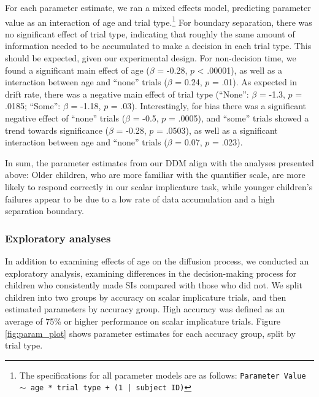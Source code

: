 \documentclass[10pt, letterpaper]{article}
\begin{document}
For each parameter estimate, we ran a mixed effects model, predicting
parameter value as an interaction of age and trial
type.\footnote{The specifications for all parameter models are as follows: \texttt{Parameter Value $\sim$ age * trial type + (1 | subject ID)}}
For boundary separation, there was no significant effect of trial type,
indicating that roughly the same amount of information needed to be
accumulated to make a decision in each trial type. This should be
expected, given our experimental design. For non-decision time, we found
a significant main effect of age (\(\beta\) = -0.28, \(p\) \textless{}
.00001), as well as a interaction between age and ``none'' trials
(\(\beta\) = 0.24, \(p\) = .01). As expected in drift rate, there was a
negative main effect of trial type (``None'': \(\beta\) = -1.3, \(p\) =
.0185; ``Some'': \(\beta\) = -1.18, \(p\) = .03). Interestingly, for
bias there was a significant negative effect of ``none'' trials
(\(\beta\) = -0.5, \(p\) = .0005), and ``some'' trials showed a trend
towards significance (\(\beta\) = -0.28, \(p\) = .0503), as well as a
significant interaction between age and ``none'' trials (\(\beta\) =
0.07, \(p\) = .023).

In sum, the parameter estimates from our DDM align with the analyses
presented above: Older children, who are more familiar with the
quantifier scale, are more likely to respond correctly in our scalar
implicature task, while younger children's failures appear to be due to
a low rate of data accumulation and a high separation boundary.

\subsubsection{Exploratory analyses}\label{exploratory-analyses}

In addition to examining effects of age on the diffusion process, we
conducted an exploratory analysis, examining differences in the
decision-making process for children who consistently made SIs compared
with those who did not. We split children into two groups by accuracy on
scalar implicature trials, and then estimated parameters by accuracy
group. High accuracy was defined as an average of 75\% or higher
performance on scalar implicature trials. Figure \ref{fig:param_plot}
shows parameter estimates for each accuracy group, split by trial type.
\end{document}
